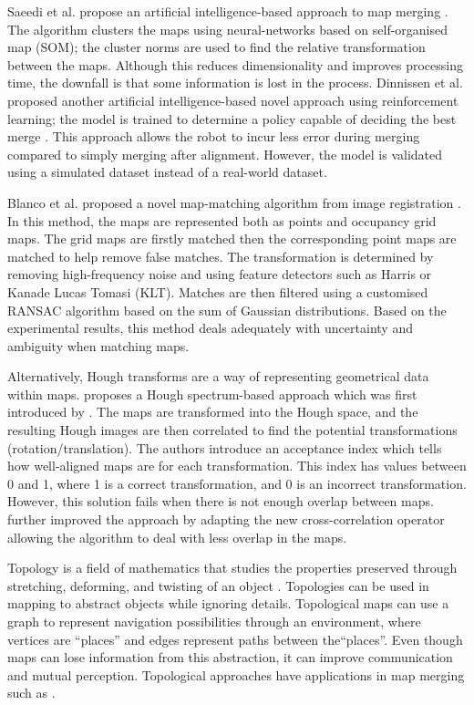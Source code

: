 Saeedi et al. propose an artificial intelligence-based approach to map merging  \cite{Saeedi2011a}. The algorithm clusters the maps using neural-networks based on self-organised map (SOM); the cluster norms are used to find the relative transformation between the maps. Although this reduces dimensionality and improves processing time, the downfall is that some information is lost in the process. Dinnissen et al. proposed another artificial intelligence-based novel approach using reinforcement learning; the model is trained to determine a policy capable of deciding the best merge \cite{Dinnissen2012}. This approach allows the robot to incur less error during merging compared to simply merging after alignment. However, the model is validated using a simulated dataset instead of a real-world dataset.
 
Blanco et al. proposed a novel map-matching algorithm from image registration \cite{Blanco2013}. In this method, the maps are represented both as points and occupancy grid maps. The grid maps are firstly matched then the corresponding point maps are matched to help remove false matches. The transformation is determined by removing high-frequency noise and using feature detectors such as Harris or Kanade Lucas Tomasi (KLT). Matches are then filtered using a customised RANSAC algorithm based on the sum of Gaussian distributions. Based on the experimental results, this method deals adequately with uncertainty and ambiguity when matching maps.

Alternatively, Hough transforms are a way of representing geometrical data within maps. \cite{Carpin2008} proposes a Hough spectrum-based approach which was first introduced by \cite{1570528}. The maps are transformed into the Hough space, and the resulting Hough images are then correlated to find the potential transformations (rotation/translation). The authors introduce an acceptance index which tells how well-aligned maps are for each transformation. This index has values between 0 and 1, where 1 is a correct transformation, and 0 is an incorrect transformation. However, this solution fails when there is not enough overlap between maps. \cite{Saeedi2014c} further improved the approach by adapting the new cross-correlation operator allowing the algorithm to deal with less overlap in the maps.

Topology is a field of mathematics that studies the properties preserved through stretching, deforming, and twisting of an object \cite{Kuipers1991}. Topologies can be used in mapping to abstract objects while ignoring details. Topological maps can use a graph to represent navigation possibilities through an environment, where vertices are ``places'' and edges represent paths between the``places''. Even though maps can lose information from this abstraction, it can improve communication and mutual perception. Topological approaches have applications in map merging such as \cite{Huang2005a, Saeedi2012a }. 

